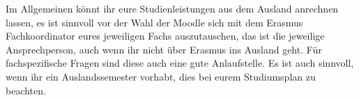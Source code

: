 Im Allgemeinen könnt ihr eure Studienleistungen aus dem Ausland anrechnen lassen, es ist sinnvoll vor der Wahl der Moodle sich mit dem Erasmus Fachkoordinator eures jeweiligen Fachs auszutauschen, das ist die jeweilige Ansprechperson, auch wenn ihr nicht über Erasmus ins Ausland geht. Für fachspezifische Fragen sind diese auch eine gute Anlaufstelle.
Es ist auch sinnvoll, wenn ihr ein Auslandssemester vorhabt, dies bei eurem Studiumsplan zu beachten.

